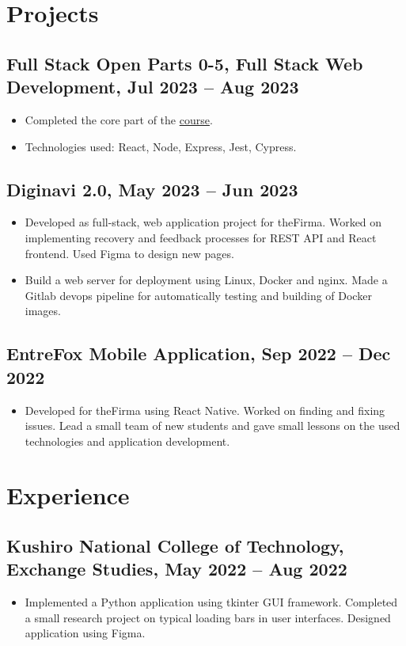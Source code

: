 \documentclass[a4paper,10pt]{article}
\begin{document}
\section*{Projects}
\subsection*{Full Stack Open Parts 0-5, Full Stack Web Development, Jul 2023 -- Aug 2023}
\begin{itemize}
    \item Completed the core part of the \href{https://fullstackopen.com/en/part0/general_info}{course}.
    \item Technologies used: React, Node, Express, Jest, Cypress.
\end{itemize}

\subsection*{Diginavi 2.0, May 2023 -- Jun 2023}
\begin{itemize}
    \item Developed as full-stack, web application project for theFirma. Worked on implementing recovery and feedback processes for REST API and React frontend. Used Figma to design new pages.
    \item Build a web server for deployment using Linux, Docker and nginx. Made a Gitlab devops pipeline for automatically testing and building of Docker images. 
\end{itemize}

\subsection*{EntreFox Mobile Application, Sep 2022 -- Dec 2022}
\begin{itemize}
    \item Developed for theFirma using React Native. Worked on finding and fixing issues. Lead a small team of new students and gave small lessons on the used technologies and application development.
\end{itemize}

\section*{Experience}
\subsection*{Kushiro National College of Technology, Exchange Studies, May 2022 -- Aug 2022}
\begin{itemize}
    \item Implemented a Python application using tkinter GUI framework. Completed a small research project on typical loading bars in user interfaces. Designed application using Figma.
\end{itemize}
\end{document}
